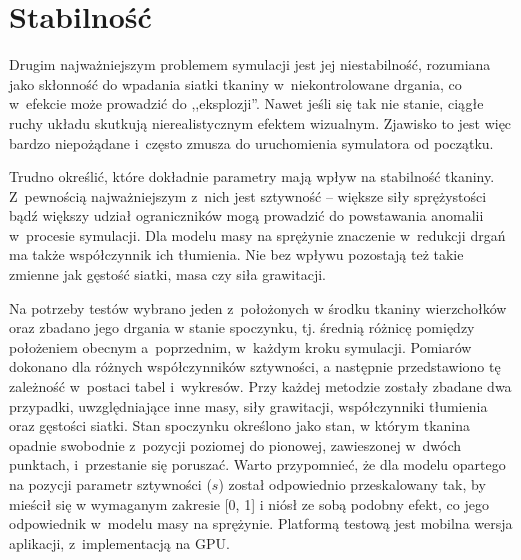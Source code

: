 		
		
		
		
		
		
	
	\section{Stabilność}
	\label{t:wyniki:stabilnosc}
	
		Drugim najważniejszym problemem symulacji jest jej niestabilność, rozumiana jako skłonność do wpadania siatki tkaniny w~niekontrolowane drgania, co w~efekcie może prowadzić do ,,eksplozji''. Nawet jeśli się tak nie stanie, ciągłe ruchy układu skutkują nierealistycznym efektem wizualnym. Zjawisko to jest więc bardzo niepożądane i~często zmusza do uruchomienia symulatora od początku.
		
		Trudno określić, które dokładnie parametry mają wpływ na stabilność tkaniny. Z~pewnością najważniejszym z~nich jest sztywność -- większe siły sprężystości bądź większy udział ograniczników mogą prowadzić do powstawania anomalii w~procesie symulacji. Dla modelu masy na sprężynie znaczenie w~redukcji drgań ma także współczynnik ich tłumienia. Nie bez wpływu pozostają też takie zmienne jak gęstość siatki, masa czy siła grawitacji.
		
		Na potrzeby testów wybrano jeden z~położonych w środku tkaniny wierzchołków oraz zbadano jego drgania w stanie spoczynku, tj. średnią różnicę pomiędzy położeniem obecnym a~poprzednim, w~każdym kroku symulacji. Pomiarów dokonano dla różnych współczynników sztywności, a następnie przedstawiono tę zależność w~postaci tabel i~wykresów. Przy każdej metodzie zostały zbadane dwa przypadki, uwzględniające inne masy, siły grawitacji, współczynniki tłumienia oraz gęstości siatki. Stan spoczynku określono jako stan, w którym tkanina opadnie swobodnie z~pozycji poziomej do pionowej, zawieszonej w~dwóch punktach, i~przestanie się poruszać. Warto przypomnieć, że dla modelu opartego na pozycji parametr sztywności (\(s\)) został odpowiednio przeskalowany tak, by mieścił się w wymaganym zakresie [0, 1] i niósł ze sobą podobny efekt, co jego odpowiednik w~modelu masy na sprężynie. Platformą testową jest mobilna wersja aplikacji, z~implementacją na GPU.
		
